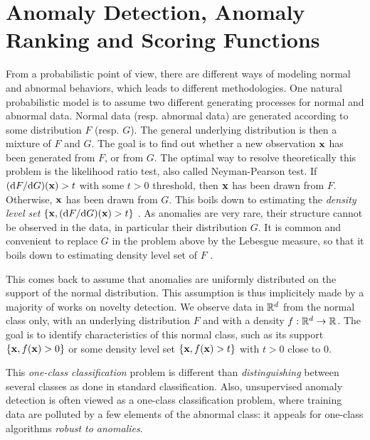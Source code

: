 \section{Anomaly Detection, Anomaly Ranking and Scoring Functions}
\label{resume:scoring_function}
From a probabilistic point of view, there are different ways of modeling normal and abnormal behaviors, which leads to different methodologies. One natural probabilistic model is to assume two different generating processes for normal and abnormal data. Normal data (resp. abnormal data) are generated according to some distribution $F$ (resp. $G$). The general underlying distribution is then a mixture of $F$ and $G$. The goal is to find out whether a new observation $\mathbf x$ has been generated from $F$, or from $G$. The optimal way to resolve theoretically this problem is the likelihood ratio test, also called Neyman-Pearson test. If $(\mathrm{d}  F / \mathrm{d}  G) ( \mathbf x) > t$ with some $t>0$ threshold, then $\mathbf x$ has been drawn from $F$. Otherwise, $\mathbf x$ has been drawn from $G$. This boils down to estimating the \emph{density level set} $\{\mathbf x, (\mathrm{d} F / \mathrm{d}  G) (\mathbf x) > t\}$ \citep{Scholkopf2001, Steinwart2005, Scott2006, VertVert}.
%
As anomalies are very rare, their structure cannot be observed in the data, in particular their distribution $G$. 
%
It is common and convenient to replace $G$ in the problem above by the Lebesgue measure, so that it boils down to estimating density level set of $F$
\citep{Scholkopf2001, Scott2006, VertVert}.

This comes back to assume that anomalies are uniformly distributed on the support of the normal distribution. %
This assumption is thus implicitely made by a majority of works on novelty detection.
We observe data in $\mathbb{R}^d$ from the normal class only, with an underlying distribution $F$ and with a density $f: \mathbb{R}^d \to \mathbb{R}$. 
The goal is to identify characteristics of this normal class, such as its support $\{\mathbf x, f( \mathbf x) > 0\}$ or some density level set $\{\mathbf x, f( \mathbf x) > t\}$ with $t>0$ close to $0$.

This \emph{one-class classification} problem is different than \emph{distinguishing} between several classes as done in standard classification. Also, unsupervised anomaly detection is often viewed as a one-class classification problem, where training data are polluted by a few elements of the abnormal class: it appeals for one-class algorithms \emph{robust to anomalies}. 

